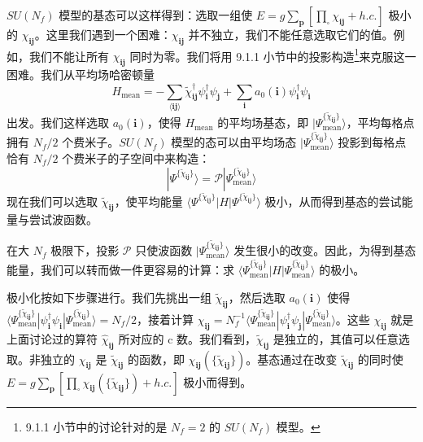 $SU(N_f)$ 模型的基态可以这样得到：选取一组使 $E=g\sum_{\pmb p}[\prod_{\square}\chi_{\pmb i\pmb j}+h.c.]$ 极小的 $\chi_{\pmb i\pmb j}$。这里我们遇到一个困难：$\chi_{\pmb i\pmb j}$ 并不独立，我们不能任意选取它们的值。例如，我们不能让所有 $\chi_{\pmb i\pmb j}$ 同时为零。我们将用 9.1.1 小节中的投影构造\footnote{9.1.1 小节中的讨论针对的是 $N_f=2$ 的 $SU(N_f)$ 模型。}来克服这一困难。我们从平均场哈密顿量
\begin{equation*}
H_{\mathrm{mean}}=-\sum_{\langle\pmb i\pmb j\rangle}\tilde\chi^{\dagger}_{\pmb i\pmb j}\psi^{\dagger}_{\pmb i}\psi_{\pmb j}+\sum_{\pmb i}a_0(\pmb i)\psi^{\dagger}_{\pmb i}\psi_{\pmb i}
\end{equation*}
出发。我们这样选取 $a_0(\pmb i)$，使得 $H_{\mathrm{mean}}$ 的平均场基态，即 $|\Psi^{\{\tilde\chi_{\pmb i\pmb j}\}}_{\mathrm{mean}}\rangle$，平均每格点拥有 $N_f/2$ 个费米子。$SU(N_f)$ 模型的态可以由平均场态 $|\Psi^{\{\tilde\chi_{\pmb i\pmb j}\}}_{\mathrm{mean}}\rangle$ 投影到每格点恰有 $N_f/2$ 个费米子的子空间中来构造：
\begin{equation*}
|\Psi^{\{\tilde\chi_{\pmb i\pmb j}\}}\rangle=\mathcal P|\Psi^{\{\tilde\chi_{\pmb i\pmb j}\}}_{\mathrm{mean}}\rangle
\end{equation*}
现在我们可以选取 $\tilde\chi_{\pmb i\pmb j}$，使平均能量 $\langle\Psi^{\{\tilde\chi_{\pmb i\pmb j}\}}|H|\Psi^{\{\tilde\chi_{\pmb i\pmb j}\}}\rangle$ 极小，从而得到基态的尝试能量与尝试波函数。

在大 $N_f$ 极限下，投影 $\mathcal P$ 只使波函数 $|\Psi^{\{\tilde\chi_{\pmb i\pmb j}\}}_{\mathrm{mean}}\rangle$ 发生很小的改变。因此，为得到基态能量，我们可以转而做一件更容易的计算：求 $\langle\Psi^{\{\tilde\chi_{\pmb i\pmb j}\}}_{\mathrm{mean}}|H|\Psi^{\{\tilde\chi_{\pmb i\pmb j}\}}_{\mathrm{mean}}\rangle$ 的极小。

极小化按如下步骤进行。我们先挑出一组 $\tilde\chi_{\pmb i\pmb j}$，然后选取 $a_0(\pmb i)$ 使得 $\langle\Psi^{\{\tilde\chi_{\pmb i\pmb j}\}}_{\mathrm{mean}}|\psi^{\dagger}_{\pmb i}\psi_{\pmb i}|\Psi^{\{\tilde\chi_{\pmb i\pmb j}\}}_{\mathrm{mean}}\rangle=N_f/2$，接着计算 $\chi_{\pmb i\pmb j}=N_f^{-1}\langle\Psi^{\{\tilde\chi_{\pmb i\pmb j}\}}_{\mathrm{mean}}|\psi^{\dagger}_{\pmb i}\psi_{\pmb j}|\Psi^{\{\tilde\chi_{\pmb i\pmb j}\}}_{\mathrm{mean}}\rangle$。这些 $\chi_{\pmb i\pmb j}$ 就是上面讨论过的算符 $\hat\chi_{\pmb i\pmb j}$ 所对应的 c 数。我们看到，$\tilde\chi_{\pmb i\pmb j}$ 是独立的，其值可以任意选取。非独立的 $\chi_{\pmb i\pmb j}$ 是 $\tilde\chi_{\pmb i\pmb j}$ 的函数，即 $\chi_{\pmb i\pmb j}(\{\tilde\chi_{\pmb i\pmb j}\})$。基态通过在改变 $\tilde\chi_{\pmb i\pmb j}$ 的同时使 $E=g\sum_{\pmb p}[\prod_{\square}\chi_{\pmb i\pmb j}(\{\tilde\chi_{\pmb i\pmb j}\})+h.c.]$ 极小而得到。

